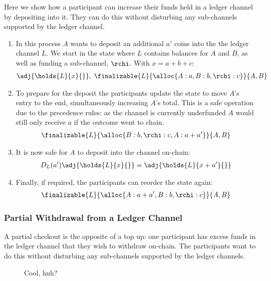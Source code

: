 Here we show how a participant can increase their funds held in a ledger channel by depositing into it.
They can do this without disturbing any sub-channels supported by the ledger channel.
\begin{enumerate}
  \item In this process $A$ wants to deposit an additional $a'$ coins into the the ledger channel $L$. We start in the state where $L$ contains balances for $A$ and $B$, as well as funding a sub-channel, $\rchi$. With $x = a + b + c$:
  \begin{align}
    \adj{\holds{L}{x}{}}, \; \finalizable{L}{\alloc{A: a, B: b, \rchi: c}}{A, B}
  \end{align}
  \item To prepare for the deposit the participants update the state to move $A$'s entry to the end, simultaneously increasing $A$'s total. This is a safe operation due to the precedence rules: as the channel is currently underfunded $A$ would still only receive $a$ if the outcome went to chain.
  \begin{align}
    \finalizable{L}{\alloc{B:b, \rchi: c, A: a + a'}}{A,B}
  \end{align}
  \item It is now safe for $A$ to deposit into the channel on-chain:
  \begin{align}
    D_L(a')\adj{\holds{L}{x}{}} = \adj{\holds{L}{x + a'}{}}
  \end{align}
  \item Finally, if required, the participants can reorder the state again:
  \begin{align}
    \finalizable{L}{\alloc{ A: a + a', B: b, \rchi: c}}{A,B}
  \end{align}
\end{enumerate}

\subsubsection{Partial Withdrawal from a Ledger Channel}

A partial checkout is the opposite of a top up: 
one participant has excess funds in the ledger channel that they wish to withdraw on-chain.
The participants want to do this without disturbing any sub-channels supported by the ledger channels.

\begin{figure}[h]\centering
  \makebox[\textwidth][c]{}
  \caption{Cool, huh?}
\end{figure}

